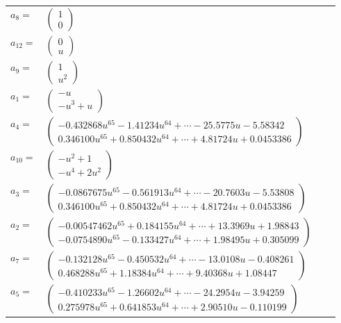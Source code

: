 \documentclass[1p]{elsarticle_modified}
\theoremstyle{definition}
\begin{document}
\begin{tabular}{m{7pt} m{180pt} m{7pt} m{180pt} }
\flushright $a_{8}=$&$\begin{pmatrix}1\\0\end{pmatrix}$ \\
\flushright $a_{12}=$&$\begin{pmatrix}0\\u\end{pmatrix}$ \\
\flushright $a_{9}=$&$\begin{pmatrix}1\\u^2\end{pmatrix}$ \\
\flushright $a_{1}=$&$\begin{pmatrix}- u\\- u^3+u\end{pmatrix}$ \\
\flushright $a_{4}=$&$\begin{pmatrix}-0.432868 u^{65}-1.41234 u^{64}+\cdots-25.5775 u-5.58342\\0.346100 u^{65}+0.850432 u^{64}+\cdots+4.81724 u+0.0453386\end{pmatrix}$ \\
\flushright $a_{10}=$&$\begin{pmatrix}- u^2+1\\- u^4+2 u^2\end{pmatrix}$ \\
\flushright $a_{3}=$&$\begin{pmatrix}-0.0867675 u^{65}-0.561913 u^{64}+\cdots-20.7603 u-5.53808\\0.346100 u^{65}+0.850432 u^{64}+\cdots+4.81724 u+0.0453386\end{pmatrix}$ \\
\flushright $a_{2}=$&$\begin{pmatrix}-0.00547462 u^{65}+0.184155 u^{64}+\cdots+13.3969 u+1.98843\\-0.0754890 u^{65}-0.133427 u^{64}+\cdots+1.98495 u+0.305099\end{pmatrix}$ \\
\flushright $a_{7}=$&$\begin{pmatrix}-0.132128 u^{65}-0.450532 u^{64}+\cdots-13.0108 u-0.408261\\0.468288 u^{65}+1.18384 u^{64}+\cdots+9.40368 u+1.08447\end{pmatrix}$ \\
\flushright $a_{5}=$&$\begin{pmatrix}-0.410233 u^{65}-1.26602 u^{64}+\cdots-24.2954 u-3.94259\\0.275978 u^{65}+0.641853 u^{64}+\cdots+2.90510 u-0.110199\end{pmatrix}$ \\

\end{tabular}
\end{document}
